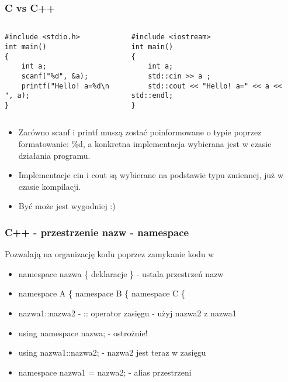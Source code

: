 \documentclass[10pt]{beamer}
\begin{document}
\begin{frame}[fragile]
  \frametitle{C vs C++}
  \begin{columns}
    \begin{column}{0.48\textwidth}
      \begin{lstlisting}
#include <stdio.h>
int main()
{
    int a;
    scanf("%d", &a);
    printf("Hello! a=%d\n ", a);
}
      \end{lstlisting}
    \end{column}
    \begin{column}{0.48\textwidth}
      \begin{lstlisting}
#include <iostream>
int main()
{
    int a;
    std::cin >> a ;
    std::cout << "Hello! a=" << a << std::endl;
}
      \end{lstlisting}
    \end{column}
  \end{columns}
  \centering
  \begin{itemize}
    \item Zarówno scanf i printf muszą zostać poinformowane o typie poprzez formatowanie: \%d, a konkretna implementacja wybierana jest w czasie działania programu.
    \item Implementacje cin i cout są wybierane na podstawie typu zmiennej, już w czasie kompilacji.
    \item Być może jest wygodniej :)
  \end{itemize}
  
\end{frame}

\begin{frame}
  \frametitle{C++ - przestrzenie nazw - namespace}
  
  Pozwalają na organizację kodu poprzez zamykanie kodu w 
  
  \begin{itemize}
    \item namespace nazwa \{ deklaracje \} - ustala przestrzeń nazw
    \item namespace A \{ namespace B \{ namespace C \{
    \item nazwa1::nazwa2 - :: operator zasięgu - użyj nazwa2 z nazwa1
    \item using namespace nazwa; - ostrożnie!
    \item using nazwa1::nazwa2; - nazwa2 jest teraz w zasięgu
    \item namespace nazwa1 = nazwa2; - alias przestrzeni
  \end{itemize}
    
\end{frame}
\end{document}
